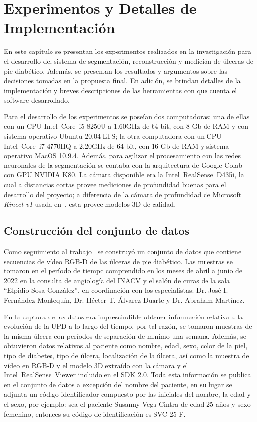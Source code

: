 \chapter{Experimentos y Detalles de Implementación}\label{chapter:implementation}

En este capítulo se presentan los experimentos realizados en la investigación para el desarrollo del sistema de segmentación, reconstrucción y medición de úlceras de pie diabético. Además, se presentan los resultados y argumentos sobre las decisiones tomadas en la propuesta final. En adición, se brindan detalles de la implementación y breves descripciones de las herramientas con que cuenta el software desarrollado.

Para el desarrollo de los experimentos se poseían dos computadoras: una de ellas con un CPU Intel\textregistered~Core\texttrademark~i5-8250U a 1.60GHz de 64-bit, con 8 Gb de RAM y con sistema operativo Ubuntu 20.04 LTS; la otra computadora con un CPU Intel\textregistered~Core\texttrademark~i7-4770HQ a 2.20GHz de 64-bit, con 16 Gb de RAM y sistema operativo MacOS 10.9.4. Además, para agilizar el procesamiento con las redes neuronales de la segmentación se contaba con la arquitectura de Google Colab con GPU NVIDIA K80. La cámara disponible era la Intel\textregistered~RealSense\texttrademark~D435i, la cual a distancias cortas provee mediciones de profundidad buenas para el desarrollo del proyecto; a diferencia de la cámara de profundidad de Microsoft \textit{Kinect v1} usada en~\cite{ching2022segm3d}, esta provee modelos 3D de calidad.

\section{Construcción del conjunto de datos}

Como seguimiento al trabajo~\cite{ching2022segm3d} se construyó un conjunto de datos que contiene secuencias de vídeo RGB-D de las úlceras de pie diabético. Las muestras se tomaron en el período de tiempo comprendido en los meses de abril a junio de 2022 en la consulta de angiología del INACV y el salón de curas de la sala ``Elpidio Sosa González'', en coordinación con los especialistas: Dr. José I. Fernández Montequín, Dr. Héctor T. Álvarez Duarte y Dr. Abraham Martínez.

En la captura de los datos era imprescindible obtener información relativa a la evolución de la UPD a lo largo del tiempo, por tal razón, se tomaron muestras de la misma úlcera con períodos de separación de mínimo una semana. Además, se obtuvieron datos relativos al paciente como nombre, edad, sexo, color de la piel, tipo de diabetes, tipo de úlcera, localización de la úlcera, así como la muestra de vídeo en RGB-D y el modelo 3D extraído con la cámara y el Intel\textregistered~RealSense\texttrademark~Viewer incluido en el SDK 2.0. Toda esta información se publica en el conjunto de datos a excepción del nombre del paciente, en su lugar se adjunta un código identificador compuesto por las iniciales del nombre, la edad y el sexo, por ejemplo: sea el paciente Susanny Vega Cintra de edad 25 años y sexo femenino, entonces su código de identificación es SVC-25-F.

